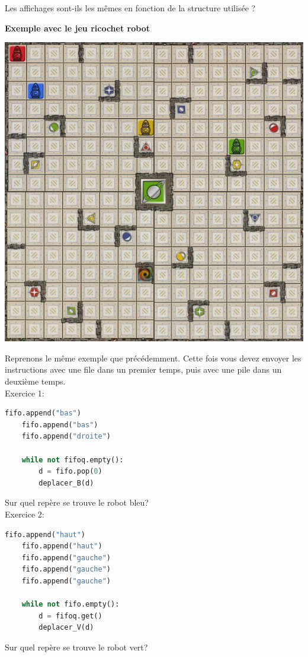 Les affichages sont-ils les mêmes en fonction de la structure utilisée ?

\newpage

\textbf{Exemple avec le jeu ricochet robot}\\
\begin{center}
    \includegraphics[width=0.7\linewidth]{Thème 1 – Structures de données/Chapitre 1 - Interface et implémentation/BLOB/ricochet-robots-plateau}
\end{center}
Reprenons le même exemple que précédemment. Cette fois vous devez envoyer les instructions avec une file dans un premier temps, puis avec une pile dans un deuxième temps.\\


Exercice 1:
\begin{lstlisting}[language=Python]
    fifo.append("bas")
    fifo.append("bas")
    fifo.append("droite")

    while not fifoq.empty():
        d = fifo.pop(0)
        deplacer_B(d)

\end{lstlisting}
Sur quel repère se trouve le robot bleu?\\

Exercice 2:
\begin{lstlisting}[language=Python]
    fifo.append("haut")
    fifo.append("haut")
    fifo.append("gauche")
    fifo.append("gauche")
    fifo.append("gauche")

    while not fifo.empty():
        d = fifoq.get()
        deplacer_V(d)
\end{lstlisting}
Sur quel repère se trouve le robot vert?\\

